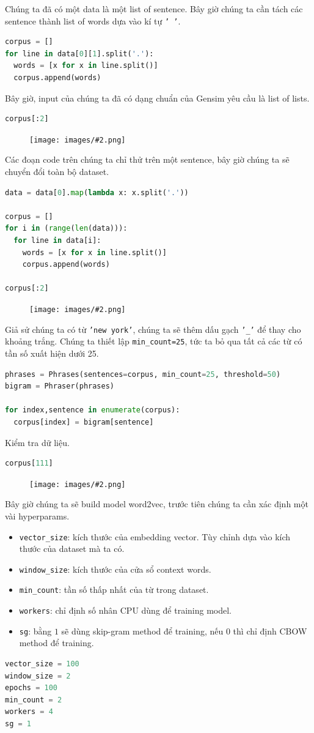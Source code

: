 \documentclass[12pt]{article}
\newcommand{\includeImage}[3]{
\begin{figure}[H]
  \centering
  \texttt{[image: images/\#2.png]}
  \def\temp{#3}\ifx\temp\empty\else\caption{#3}\fi
\end{figure}}
\begin{document}
\vskip 0.5cm
\indent Chúng ta đã có một data là một list of sentence. Bây giờ chúng ta cần tách các sentence thành list of words dựa vào kí tự \texttt{' '}.
\begin{lstlisting}[language=python]
corpus = []
for line in data[0][1].split('.'):
  words = [x for x in line.split()]
  corpus.append(words)
\end{lstlisting}

\vskip 0.5cm
\indent Bây giờ, input của chúng ta đã có dạng chuẩn của Gensim yêu cầu là list of lists.
\begin{lstlisting}[language=python]
corpus[:2]
\end{lstlisting}
\includeImage{1}{18}{}

\vskip 0.5cm
\indent Các đoạn code trên chúng ta chỉ thử trên một sentence, bây giờ chúng ta sẽ chuyển đổi toàn bộ dataset.
\begin{lstlisting}[language=python]
data = data[0].map(lambda x: x.split('.'))

corpus = []
for i in (range(len(data))):
  for line in data[i]:
    words = [x for x in line.split()]
    corpus.append(words)

corpus[:2]
\end{lstlisting}
\includeImage{1}{19}{}

\vskip 0.5cm
\indent Giả sử chúng ta có từ \texttt{'new\ york'}, chúng ta sẽ thêm dấu gạch \texttt{'\_'} để thay cho khoảng trắng. Chúng ta thiết lập \texttt{min\_count=25}, tức ta bỏ qua tất cả các từ có tần số xuất hiện dưới 25.
\begin{lstlisting}[language=python]
phrases = Phrases(sentences=corpus, min_count=25, threshold=50)
bigram = Phraser(phrases)

for index,sentence in enumerate(corpus):
  corpus[index] = bigram[sentence]
\end{lstlisting}

\vskip 0.5cm
\indent Kiểm tra dữ liệu.
\begin{lstlisting}[language=python]
corpus[111]
\end{lstlisting}
\includeImage{1}{20}{}

\vskip 0.5cm
\indent Bây giờ chúng ta sẽ build model word2vec, trước tiên chúng ta cần xác định một vài hyperparams.
\begin{itemize}
  \item \texttt{vector\_size}: kích thước của embedding vector. Tùy chỉnh dựa vào kích thước của dataset mà ta có.
  \item \texttt{window\_size}: kích thước của cửa sổ context words.
  \item \texttt{min\_count}: tần số thấp nhất của từ trong dataset.
  \item \texttt{workers}: chỉ định số nhân CPU dùng để training model. 
  \item \texttt{sg}: bằng $1$ sẽ dùng skip-gram method để training, nếu $0$ thì chỉ định CBOW method để training.
\end{itemize}
\begin{lstlisting}[language=python]
vector_size = 100
window_size = 2
epochs = 100
min_count = 2
workers = 4
sg = 1
\end{lstlisting}
\end{document}
